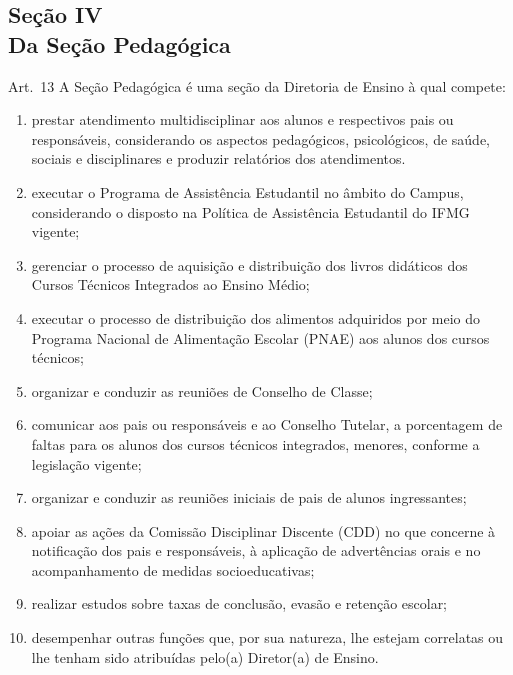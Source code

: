 \documentclass[a4paper,12pt]{report}
\begin{document}
\subsection{Seção IV \\ Da Seção Pedagógica}

Art.~13 A Seção Pedagógica é uma seção da Diretoria de Ensino à qual compete:

\begin{enumerate}
\renewcommand{\labelenumi}{\Roman{enumi}}

\item prestar atendimento multidisciplinar aos alunos e respectivos pais ou responsáveis,  
      considerando os aspectos pedagógicos, psicológicos, de saúde, sociais e disciplinares e produzir relatórios dos atendimentos.  
     
\item executar o Programa de Assistência Estudantil no âmbito do Campus, considerando o 
      disposto na Política de Assistência Estudantil do IFMG vigente;
      
\item gerenciar o processo de aquisição e distribuição dos livros didáticos dos Cursos 
      Técnicos Integrados ao Ensino Médio;

\item executar o processo de distribuição dos alimentos adquiridos por meio do Programa 
      Nacional de Alimentação Escolar (PNAE) aos alunos dos cursos técnicos;
      
\item organizar e conduzir as reuniões de Conselho de Classe;

\item comunicar aos pais ou responsáveis e ao Conselho Tutelar, a porcentagem de faltas 
      para os alunos dos cursos técnicos integrados, menores, conforme a legislação vigente;

\item organizar e conduzir as reuniões iniciais de pais de alunos ingressantes;
    
\item apoiar as ações da Comissão Disciplinar Discente (CDD) no que concerne à notificação 
      dos pais e responsáveis, à aplicação de advertências orais e no acompanhamento de medidas socioeducativas;
      
\item realizar estudos sobre taxas de conclusão, evasão e retenção escolar;
 
\item desempenhar outras funções que, por sua natureza, lhe estejam correlatas ou lhe 
      tenham sido atribuídas pelo(a) Diretor(a) de Ensino.
\end{enumerate}
\end{document}
